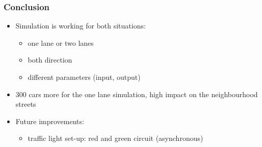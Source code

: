 \documentclass[9pt]{beamer}
\begin{document}
\begin{frame}
\frametitle{Conclusion}

\begin{itemize}
\item Simulation is working for both situations: 
\begin{itemize}
\item one  lane or two lanes
\item both direction
\item different parameters (input, output)
\end{itemize}
\vspace{1cm}
\item 300 cars more for the one lane simulation, high impact on the neighbourhood streets
\vspace{1cm}
\item Future improvements:
\begin{itemize}
\item traffic light set-up: red and green circuit (asynchronous)  
\end{itemize}

\end{itemize}

\end{frame}
\end{document}
